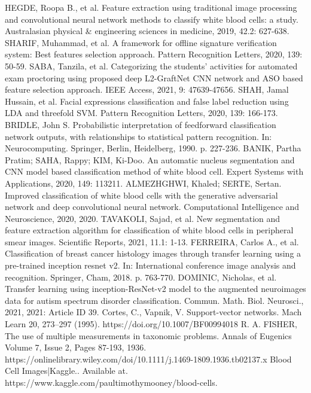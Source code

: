 \documentclass[conference]{IEEEtran}
\begin{document}
\begin{thebibliography}{00}
 HEGDE, Roopa B., et al. Feature extraction using traditional image processing and convolutional neural network methods to classify white blood cells: a study. Australasian physical \& engineering sciences in medicine, 2019, 42.2: 627-638. 
 SHARIF, Muhammad, et al. A framework for offline signature verification system: Best features selection approach. Pattern Recognition Letters, 2020, 139: 50-59.
 SABA, Tanzila, et al. Categorizing the students’ activities for automated exam proctoring using proposed deep L2-GraftNet CNN network and ASO based feature selection approach. IEEE Access, 2021, 9: 47639-47656.
 SHAH, Jamal Hussain, et al. Facial expressions classification and false label reduction using LDA and threefold SVM. Pattern Recognition Letters, 2020, 139: 166-173.
 BRIDLE, John S. Probabilistic interpretation of feedforward classification network outputs, with relationships to statistical pattern recognition. In: Neurocomputing. Springer, Berlin, Heidelberg, 1990. p. 227-236.
 BANIK, Partha Pratim; SAHA, Rappy; KIM, Ki-Doo. An automatic nucleus segmentation and CNN model based classification method of white blood cell. Expert Systems with Applications, 2020, 149: 113211. 
 ALMEZHGHWI, Khaled; SERTE, Sertan. Improved classification of white blood cells with the generative adversarial network and deep convolutional neural network. Computational Intelligence and Neuroscience, 2020, 2020.
 TAVAKOLI, Sajad, et al. New segmentation and feature extraction algorithm for classification of white blood cells in peripheral smear images. Scientific Reports, 2021, 11.1: 1-13.
 FERREIRA, Carlos A., et al. Classification of breast cancer histology images through transfer learning using a pre-trained inception resnet v2. In: International conference image analysis and recognition. Springer, Cham, 2018. p. 763-770. 
 DOMINIC, Nicholas, et al. Transfer learning using inception-ResNet-v2 model to the augmented neuroimages data for autism spectrum disorder classification. Commun. Math. Biol. Neurosci., 2021, 2021: Article ID 39. 
 Cortes, C., Vapnik, V. Support-vector networks. Mach Learn 20, 273–297 (1995). https://doi.org/10.1007/BF00994018
 R. A. FISHER, The use of multiple measurements in taxonomic problems. Annals of Eugenics Volume 7, Issue 2, Pages 87-193, 1936. https://onlinelibrary.wiley.com/doi/10.1111/j.1469-1809.1936.tb02137.x
 Blood Cell Images|Kaggle.. Available at. https://www.kaggle.com/paultimothymooney/blood-cells.

\end{thebibliography}
\end{document}
